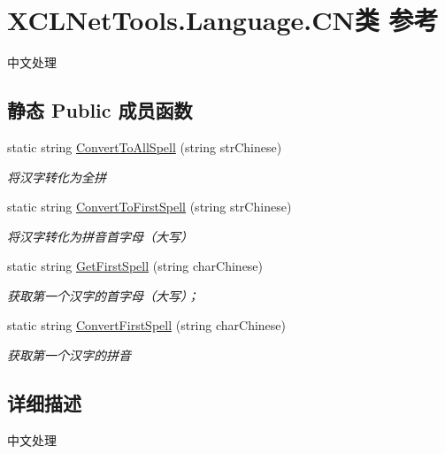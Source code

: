 \hypertarget{class_x_c_l_net_tools_1_1_language_1_1_c_n}{}\section{X\+C\+L\+Net\+Tools.\+Language.\+C\+N类 参考}
\label{class_x_c_l_net_tools_1_1_language_1_1_c_n}


中文处理  


\subsection*{静态 Public 成员函数}
\begin{DoxyCompactItemize}
\item 
static string \hyperlink{class_x_c_l_net_tools_1_1_language_1_1_c_n_a298b6a886b268ba4f667304e25cf5c93}{Convert\+To\+All\+Spell} (string str\+Chinese)
\begin{DoxyCompactList}\small\item\em 将汉字转化为全拼 \end{DoxyCompactList}\item 
static string \hyperlink{class_x_c_l_net_tools_1_1_language_1_1_c_n_adad5709d68f61a8cb7002ce6abf72c54}{Convert\+To\+First\+Spell} (string str\+Chinese)
\begin{DoxyCompactList}\small\item\em 将汉字转化为拼音首字母（大写） \end{DoxyCompactList}\item 
static string \hyperlink{class_x_c_l_net_tools_1_1_language_1_1_c_n_ae8a020bfe3d0b396edb88d8529decb29}{Get\+First\+Spell} (string char\+Chinese)
\begin{DoxyCompactList}\small\item\em 获取第一个汉字的首字母（大写）； \end{DoxyCompactList}\item 
static string \hyperlink{class_x_c_l_net_tools_1_1_language_1_1_c_n_ac25cb893e8f56ae3ce28a04f4665c51d}{Convert\+First\+Spell} (string char\+Chinese)
\begin{DoxyCompactList}\small\item\em 获取第一个汉字的拼音 \end{DoxyCompactList}\end{DoxyCompactItemize}


\subsection{详细描述}
中文处理 



